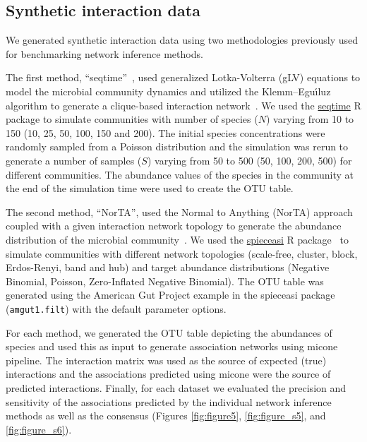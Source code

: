   \subsection*{Synthetic interaction data}
  \vspace{-5mm}
  We generated synthetic interaction data using two methodologies previously used for benchmarking network inference methods.

  The first method, ``seqtime''~\cite{faustSignaturesEcologicalProcesses2018}, used generalized Lotka-Volterra (gLV) equations to model the microbial community dynamics and utilized the Klemm–Eguı́luz algorithm to generate a clique-based interaction network~\cite{Rottjers2018}.
  We used the \href{https://github.com/hallucigenia-sparsa/seqtime}{seqtime} R package to simulate communities with number of species ($N$) varying from 10 to 150 (10, 25, 50, 100, 150 and 200).
  The initial species concentrations were randomly sampled from a Poisson distribution and the simulation was rerun to generate a number of samples ($S$) varying from 50 to 500 (50, 100, 200, 500) for different communities.
  The abundance values of the species in the community at the end of the simulation time were used to create the OTU table.

  The second method, ``NorTA'', used the Normal to Anything (NorTA) approach coupled with a given interaction network topology to generate the abundance distribution of the microbial community~\cite{Kurtz2015}.
  We used the \href{https://github.com/zdk123/SpiecEasi}{spieceasi} R package~\cite{Kurtz2015} to simulate communities with different network topologies (scale-free, cluster, block, Erdos-Renyi, band and hub) and target abundance distributions (Negative Binomial, Poisson, Zero-Inflated Negative Binomial).
  The OTU table was generated using the American Gut Project example in the spieceasi package (\texttt{amgut1.filt}) with the default parameter options.

  For each method, we generated the OTU table depicting the abundances of species and used this as input to generate association networks using \ac{micone} pipeline.
  The interaction matrix was used as the source of expected (true) interactions and the associations predicted using \ac{micone} were the source of predicted interactions.
  Finally, for each dataset we evaluated the precision and sensitivity of the associations predicted by the individual network inference methods as well as the consensus (Figures \ref{fig:figure5}, \ref{fig:figure_s5}, and \ref{fig:figure_s6}).

